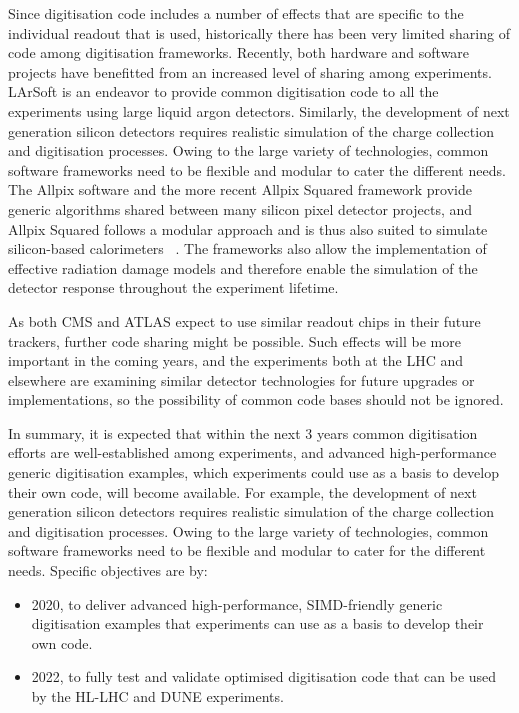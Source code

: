 \documentclass[12pt,a4paper]{article}
\begin{document}
Since digitisation code includes a number of effects that are specific
to the individual readout that is used, historically there has been very
limited sharing of code among digitisation frameworks. Recently, both
hardware and software projects have benefitted from an increased level
of sharing among experiments. LArSoft is an endeavor to provide common
digitisation code to all the experiments using large liquid argon
detectors. Similarly, the development of next generation silicon
detectors requires realistic simulation of the charge collection and
digitisation processes. Owing to the large variety of technologies,
common software frameworks need to be flexible and modular to cater the
different needs. The Allpix software and the more recent Allpix Squared
framework provide generic algorithms shared between many silicon pixel
detector projects, and Allpix Squared follows a modular approach and is
thus also suited to simulate silicon-based calorimeters ~\cite{Allpix}. The
frameworks also allow the implementation of effective radiation damage
models and therefore enable the simulation of the detector response
throughout the experiment lifetime.

As both CMS and ATLAS expect to use similar readout chips in their
future trackers, further code sharing might be possible. Such effects
will be more important in the coming years, and the experiments both at
the LHC and elsewhere are examining similar detector technologies for
future upgrades or implementations, so the possibility of common code
bases should not be ignored.

In summary, it is expected that within the next 3 years common
digitisation efforts are well-established among experiments, and
advanced high-performance generic digitisation examples, which
experiments could use as a basis to develop their own code, will become
available. For example, the development of next generation silicon
detectors requires realistic simulation of the charge collection and
digitisation processes. Owing to the large variety of technologies,
common software frameworks need to be flexible and modular to cater for
the different needs. Specific objectives are by:

\begin{itemize}
\item
  2020, to deliver advanced high-performance, SIMD-friendly generic
  digitisation examples that experiments can use as a basis to develop
  their own code.
\item
  2022, to fully test and validate optimised digitisation code that can
  be used by the HL-LHC and DUNE experiments.
\end{itemize}
\end{document}

